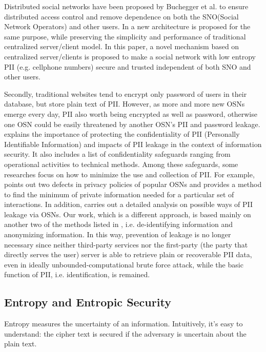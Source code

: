 \documentclass[10pt, conference, compsocconf]{IEEEtran}
\begin{document}
	Distributed social networks have been proposed by 
	Buchegger et al.\cite{lzf3, lzf4} to ensure distributed access control and
	remove dependence on both the SNO(Social Network Operators) and other users.
	In \cite{lzf5} a new architecture is proposed for the same purpose, 
	while preserving the simplicity and performance of traditional centralized server/client model.
	In this paper, a novel mechanism based on centralized 
	server/clients is proposed to make a social network with low entropy PII
	(e.g. cellphone numbers) secure and trusted independent of both SNO and other users.
	
	Secondly, traditional websites tend to encrypt only password of users in their database, 
	but store plain text of PII. However, as more and more new OSNs emerge every day, 
	PII also worth being encrypted as well as password, otherwise
	one OSN could be easily threatened by another OSN's PII and password leakage. \cite{guide}
	explains the importance of protecting the confidentiality of PII (Personally 
	Identifiable Information) and impacts of PII leakage in the 
	context of information security. It also includes a list of confidentiality 
	safeguards ranging from operational activities to technical methods. Among 
	these safeguards, some researches focus on how to minimize the use and 
	collection of PII. For example, \cite{charact} points out two defects 
	in privacy policies of popular OSNs and provides a method to find the minimum 
	of private information needed for a particular set of interactions. In addition, 
	\cite{leakage} carries out a detailed analysis on possible ways of PII 
	leakage via OSNs. Our work, which is a different approach, is based mainly 
	on another two of the methods listed in \cite{guide}, i.e. de-identifying 
	information and anonymizing information. In this way, prevention of leakage is no 
	longer necessary since neither third-party services nor the first-party 
	(the party that directly serves the user) server is able to retrieve plain or 
	recoverable PII data, even in ideally unbounded-computational brute force attack, 
	while the basic function of PII, i.e. identification, is remained.
	
	\subsection{Entropy and Entropic Security}
	Entropy\cite{entropy} measures the uncertainty of an information. Intuitively, it's easy to
	understand: the cipher text is secured
	if the adversary is uncertain about the plain text.
	
\end{document}
